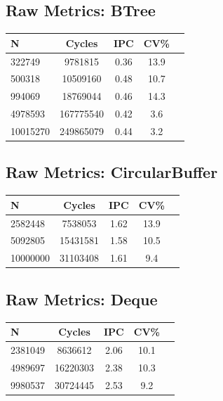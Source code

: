 \subsection*{Raw Metrics: BTree}
\begin{table}[H]
\centering
{}
\begin{tabular}{@{}lcccc@{}}
\toprule
\rowcolor{teal!20} N & Cycles & IPC & CV\% \\ \midrule
322749 & 9781815 & 0.36 & 13.9 \\ 
500318 & 10509160 & 0.48 & 10.7 \\ 
994069 & 18769044 & 0.46 & 14.3 \\ 
4978593 & 167775540 & 0.42 & 3.6 \\ 
10015270 & 249865079 & 0.44 & 3.2 \\ 
\bottomrule
\end{tabular}
\end{table}

\clearpage
\subsection*{Raw Metrics: CircularBuffer}
\begin{table}[H]
\centering
{}
\begin{tabular}{@{}lcccc@{}}
\toprule
\rowcolor{teal!20} N & Cycles & IPC & CV\% \\ \midrule
2582448 & 7538053 & 1.62 & 13.9 \\ 
5092805 & 15431581 & 1.58 & 10.5 \\ 
10000000 & 31103408 & 1.61 & 9.4 \\ 
\bottomrule
\end{tabular}
\end{table}

\subsection*{Raw Metrics: Deque}
\begin{table}[H]
\centering
{}
\begin{tabular}{@{}lcccc@{}}
\toprule
\rowcolor{teal!20} N & Cycles & IPC & CV\% \\ \midrule
2381049 & 8636612 & 2.06 & 10.1 \\ 
4989697 & 16220303 & 2.38 & 10.3 \\ 
9980537 & 30724445 & 2.53 & 9.2 \\ 
\bottomrule
\end{tabular}
\end{table}

